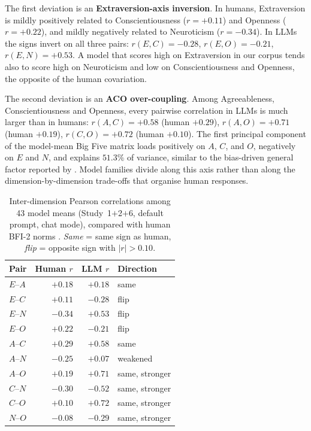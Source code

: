 \documentclass[11pt]{article}
\begin{document}
The first deviation is an \textbf{Extraversion-axis inversion}.
In humans, Extraversion is mildly positively related to Conscientiousness ($r = +0.11$) and Openness ($r = +0.22$), and mildly negatively related to Neuroticism ($r = -0.34$).
In LLMs the signs invert on all three pairs: $r(E, C) = -0.28$, $r(E, O) = -0.21$, $r(E, N) = +0.53$.
A model that scores high on Extraversion in our corpus tends also to score high on Neuroticism and low on Conscientiousness and Openness, the opposite of the human covariation.

The second deviation is an \textbf{ACO over-coupling}.
Among Agreeableness, Conscientiousness and Openness, every pairwise correlation in LLMs is much larger than in humans: $r(A, C) = +0.58$ (human $+0.29$), $r(A, O) = +0.71$ (human $+0.19$), $r(C, O) = +0.72$ (human $+0.10$).
The first principal component of the model-mean Big Five matrix loads positively on $A$, $C$, and $O$, negatively on $E$ and $N$, and explains $51.3\%$ of variance, similar to the bias-driven general factor reported by \citet{braun2025acquiescence}.
Model families divide along this axis rather than along the dimension-by-dimension trade-offs that organise human responses.

\begin{table}[!htb]
\centering
\caption{Inter-dimension Pearson correlations among 43 model means (Study~1$+$2$+$6, default prompt, chat mode), compared with human BFI-2 norms \citep{soto2017bfi2}. \emph{Same} = same sign as human, \emph{flip} = opposite sign with $|r|>0.10$.}
\label{tab:corr_corrected}
\footnotesize
\begin{tabular}{lrrl}
\toprule
Pair & Human $r$ & LLM $r$ & Direction \\
\midrule
$E$--$A$ & $+0.18$ & $+0.18$ & same \\
$E$--$C$ & $+0.11$ & $-0.28$ & flip \\
$E$--$N$ & $-0.34$ & $+0.53$ & flip \\
$E$--$O$ & $+0.22$ & $-0.21$ & flip \\
$A$--$C$ & $+0.29$ & $+0.58$ & same \\
$A$--$N$ & $-0.25$ & $+0.07$ & weakened \\
$A$--$O$ & $+0.19$ & $+0.71$ & same, stronger \\
$C$--$N$ & $-0.30$ & $-0.52$ & same, stronger \\
$C$--$O$ & $+0.10$ & $+0.72$ & same, stronger \\
$N$--$O$ & $-0.08$ & $-0.29$ & same, stronger \\
\bottomrule
\end{tabular}
\end{table}
\end{document}
